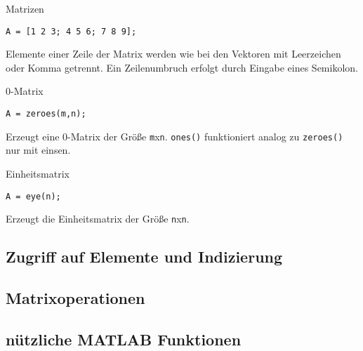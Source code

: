             \begin{CodeErklaerungBox}{Matrizen}
                \begin{lstlisting}
A = [1 2 3; 4 5 6; 7 8 9];
                \end{lstlisting}
                \tcblower
                Elemente einer Zeile der Matrix werden wie bei den Vektoren mit Leerzeichen oder Komma getrennt. Ein Zeilenumbruch erfolgt durch Eingabe eines Semikolon.
            \end{CodeErklaerungBox}
            \begin{CodeErklaerungBox}{0-Matrix}
                \begin{lstlisting}
A = zeroes(m,n);
                \end{lstlisting}
                \tcblower
                Erzeugt eine 0-Matrix der Größe \texttt{m}x\texttt{n}. \texttt{ones()} funktioniert analog zu \texttt{zeroes()} nur mit einsen.
            \end{CodeErklaerungBox}
            \begin{CodeErklaerungBox}{Einheitsmatrix}
                \begin{lstlisting}
A = eye(n);
                \end{lstlisting}
                \tcblower
                Erzeugt die Einheitsmatrix der Größe \texttt{n}x\texttt{n}.
            \end{CodeErklaerungBox}
        \subsection{Zugriff auf Elemente und Indizierung}
        \subsection{Matrixoperationen}
        \subsection{nützliche MATLAB Funktionen}